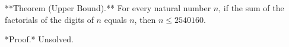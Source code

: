 
**Theorem (Upper Bound).** For every natural number $n$, if the sum of the factorials of the digits of $n$ equals $n$, then $n \leq 2540160$.

*Proof.* Unsolved.